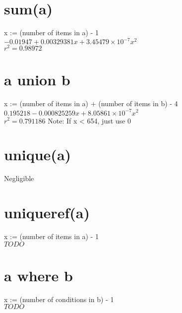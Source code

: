 \documentclass[12pt]{article}
\begin{document}
	\section{sum(a)}
	x := (number of items in a) - 1\\
	$-0.01947 + 0.00329381 x + 3.45479 \times 10^{-7} x^2$\\
	$r^2 = 0.98972$
	
	\section{a union b}
	x := (number of items in a) + (number of items in b) - 4\\
	$0.195218 - 0.000825259 x + 8.05861 \times 10^{-7} x^2$\\
	$r^2 = 0.791186$
	Note: If x < 654, just use 0
	
	\section{unique(a)}
	Negligible
	
	\section{uniqueref(a)}
	x := (number of items in a) - 1\\
	$TODO$
	
	\section{a where b}
	x := (number of conditions in b) - 1\\
	$TODO$
\end{document}
